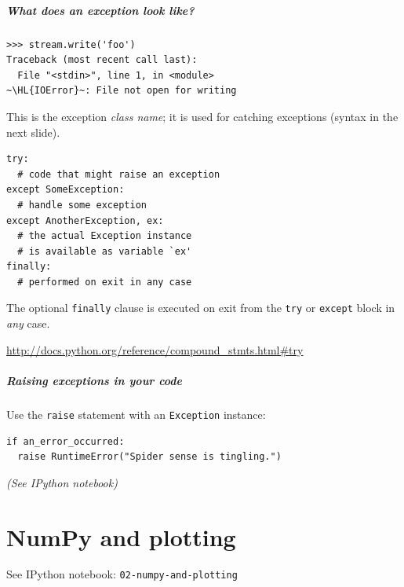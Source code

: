 \documentclass[english,serif,mathserif,xcolor=pdftex,dvipsnames,table]{beamer}
\begin{document}
\begin{frame}[fragile]
  \frametitle{What does an exception look like?}
\begin{lstlisting}
>>> stream.write('foo')
Traceback (most recent call last):
  File "<stdin>", line 1, in <module>
~\HL{IOError}~: File not open for writing
\end{lstlisting}

  \+ This is the exception \emph{class name}; it is used for catching
  exceptions (syntax in the next slide).
\end{frame}


\begin{frame}[fragile]
\begin{lstlisting}
try:
  # code that might raise an exception
except SomeException:
  # handle some exception
except AnotherException, ex:
  # the actual Exception instance
  # is available as variable `ex'
finally:
  # performed on exit in any case
\end{lstlisting}

  \+
  The optional \lstinline|finally| clause is executed on exit from the
  \lstinline|try| or \lstinline|except| block in \emph{any} case.

  \begin{references}
    \scriptsize
    \url{http://docs.python.org/reference/compound_stmts.html#try}
\end{references}
\end{frame}


\begin{frame}[fragile]
  \frametitle{Raising exceptions in your code}
  Use the \lstinline|raise| statement with an \texttt{Exception}
  instance:
\begin{lstlisting}
if an_error_occurred:
  raise RuntimeError("Spider sense is tingling.")
\end{lstlisting}
\end{frame}


\begin{frame}
  \begin{exercise*}[1]
    \em (See IPython notebook)
  \end{exercise*}
\end{frame}


\part{NumPy and plotting}

\begin{frame}

  {\Huge See IPython notebook:
    \texttt{02-numpy-and-plotting}}
\end{frame}
\end{document}
